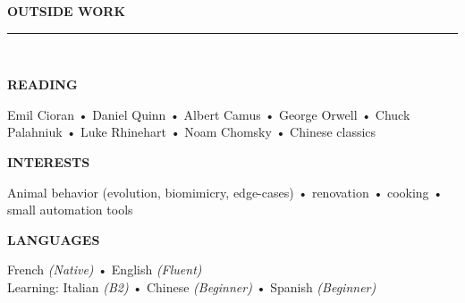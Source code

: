 \documentclass[10pt,a4paper]{article}
\newcommand{\pink}[1]{\textcolor{cvpink}{\textbf{#1}}}
\newcommand{\muted}[1]{\textcolor{cvmute}{#1}}
\newcommand{\sectiongap}{\vspace{15pt}}
\newcommand{\cvsect}[1]{%
  {\small\textcolor{cvaccent}{\MakeUppercase{\textbf{#1}}}}\\[-0.2em]
  \textcolor{cvaccent}{\rule{\linewidth}{1pt}}\\[0.4em]
}
\newcommand{\smallcard}[2]{%
  \begin{tcolorbox}[cvcard]
    {\small\pink{\MakeUppercase{#1}}}
    \par\vspace{1.8mm}
    {\small #2}
  \end{tcolorbox}%
}
\begin{document}
\sectiongap
\cvsect{Outside Work}

\begin{minipage}[t]{0.31\textwidth}
  \smallcard{Reading}{
    \muted{Emil Cioran • Daniel Quinn • Albert Camus • George Orwell • Chuck Palahniuk • Luke Rhinehart • Noam Chomsky • Chinese classics}
  }
\end{minipage}%
\hfill
\begin{minipage}[t]{0.31\textwidth}
  \smallcard{Interests}{
    \muted{Animal behavior (evolution, biomimicry, edge-cases) • renovation • cooking • small automation tools}
  }
\end{minipage}%
\hfill
\begin{minipage}[t]{0.31\textwidth}
  \smallcard{Languages}{
    \muted{\worldflag[width=7pt,framewidth=0mm]{FR}French \textit{(Native)} • \worldflag[width=7pt,framewidth=0mm]{GB}English \textit{(Fluent)}}\\[1mm]
    \muted{Learning: \worldflag[width=7pt,framewidth=0mm]{IT}Italian \textit{(B2)} • \worldflag[width=7pt,framewidth=0mm]{CN}Chinese \textit{(Beginner)} • \worldflag[width=7pt,framewidth=0mm]{ES}Spanish \textit{(Beginner)}}
  }
\end{minipage}
\end{document}
